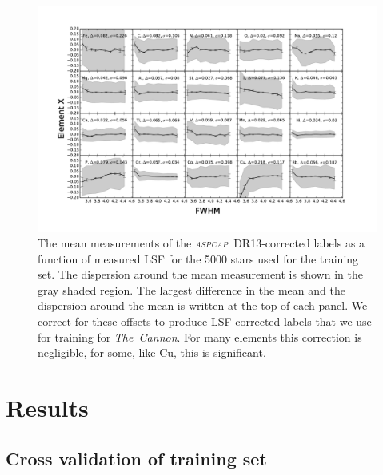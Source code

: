 \documentclass[14pt, preprint2]{aastex6}
\newcommand{\project}[1]{\textsl{#1}}
\newcommand{\tc}{\project{The~Cannon}}
\newcommand{\aspcap}{\project{\textsc{aspcap}}}
\begin{document}
\begin{figure}[]
\includegraphics[scale=0.6]{training_input.pdf} 
  \caption{The mean measurements of the \aspcap\ DR13-corrected labels as a function of measured LSF for the 5000 stars used for the training set. The dispersion around the mean measurement is shown in the gray shaded region. The largest difference in the mean and the dispersion around the mean is written at the top of each panel. We correct for these offsets to produce LSF-corrected labels that we use for training for \tc. For many elements this correction is negligible, for some, like Cu, this is significant.  }
\label{fig:training}
\end{figure}



\section{Results}

\subsection{Cross validation of training set} 
\end{document}
